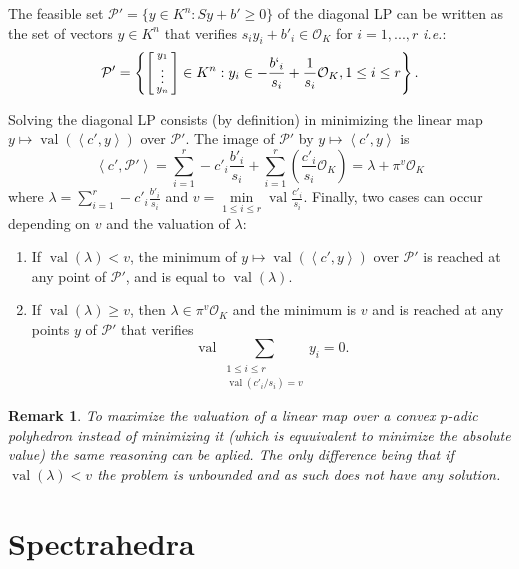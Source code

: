 \documentclass[a4paper,12pt]{article}
\newtheorem{remark}{Remark}
\newcommand{\PP}{\mathcal{P}}
\DeclareMathOperator{\val}{val}
\newcommand{\OK}{\mathcal{O}_K}
\begin{document}
The feasible set $\PP' = \{y \in K^n : Sy+b' \geq 0\}$ of the diagonal LP can be written as the set of vectors
$y \in K^n$ that verifies $s_i y_i + b'_i \in \OK$ for $i=1,...,r$ {\it i.e.}:
$$
\PP' = \left\{\left[\begin{smallmatrix} y_1\\ \vdots\\ y_n \end{smallmatrix}\right] \in K^n :
y_i \in -\frac{b`_i}{s_i} + \frac{1}{s_i} \OK, 1\le i\le r\right\}.
$$

Solving the diagonal LP consists (by definition) in minimizing the linear map $y \mapsto \val\left(\left\langle
c',y \right\rangle\right)$ over $\PP'$. The image of $\PP'$ by $y \mapsto \left\langle c',y \right\rangle$ is
$$
\left\langle c',\PP' \right\rangle = \sum_{i=1}^r -c'_i \frac{b'_i}{s_i} + \sum_{i=1}^r\left( \frac{c'_i}{s_{i}} \OK \right) = \lambda + \pi^{v} \OK
$$
where $\lambda = \sum_{i=1}^r -c'_i \frac{b'_i}{s_i}$ and $v = \min\limits_{1\le i\le r} \val \frac{c'_{i}}{s_{i}} $.
Finally, two cases can occur depending on $v$ and the valuation of $\lambda$:
\begin{enumerate}
\item
  If $\val(\lambda) < v$, the minimum of $y\mapsto \val\left(\left\langle c',y \right\rangle\right)$ over $\PP'$
  is reached at any point of $\PP'$, and is equal to $\val(\lambda)$.
\item
  If $\val(\lambda) \ge v$, then $\lambda \in \pi^{v} \OK$ and the minimum is $v$ and is reached at any points $y$
  of $\PP'$ that verifies 
  \[\val \underset{ \begin{array}{c} 1\le i\le r\\ \val\left(c'_{i}/{s_{i}} \right) = v  \end{array}}{\sum} y_{i} = 0. \]
\end{enumerate}

\begin{remark}
	To maximize the valuation of a linear map over a convex $p$-adic polyhedron instead of minimizing it (which is equuivalent to minimize the absolute value) the same reasoning can be aplied. The only difference being that if $\val\left( \lambda\right) < v$ the problem is unbounded and as such does not have any solution. 
\end{remark}




\section{Spectrahedra}
\end{document}
